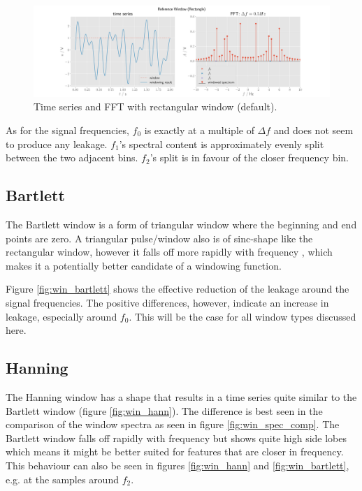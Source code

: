 \documentclass[10pt, a4paper]{article}
\begin{document}
\begin{figure}[h]
  \centering
  \includegraphics[width=\textwidth]{graphics/Rectangle.pdf}
  \caption{Time series and FFT with rectangular window (default).}\label{fig:win_rect}
\end{figure}

As for the signal frequencies, $f_{0}$ is exactly at a multiple of $\Delta f$ and does not seem to produce any leakage. $f_{1}$'s spectral content is approximately evenly split between the two adjacent bins. $f_{2}$'s split is in favour of the closer frequency bin.


\subsection{Bartlett}
The Bartlett window is a form of triangular window where the beginning and end points are zero. \cite{scipy_doc_bartlett} A triangular pulse/window also is of sinc-shape like the rectangular window, however it falls off more rapidly with frequency \cite{triang_pulse}\cite{ulrich_maths}, which makes it a potentially better candidate of a windowing function.


Figure \ref{fig:win_bartlett} shows the effective reduction of the leakage around the signal frequencies. The positive differences, however, indicate an increase in leakage, especially around $f_{0}$. This will be the case for all window types discussed here.



\subsection{Hanning}
The Hanning window has a shape that results in a time series quite similar to the Bartlett window (figure \ref{fig:win_hann}). The difference is best seen in the comparison of the window spectra as seen in figure \ref{fig:win_spec_comp}. The Bartlett window falls off rapidly with frequency but shows quite high side lobes which means it might be better suited for features that are closer in frequency. This behaviour can also be seen in figures \ref{fig:win_hann} and \ref{fig:win_bartlett}, e.g. at the samples around $f_{2}$.
\end{document}
